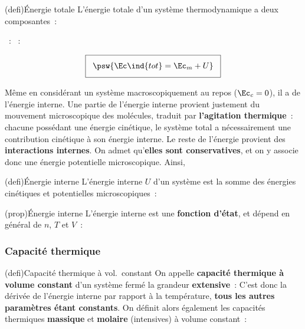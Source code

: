 \documentclass[../../main/main.tex]{subfiles}
\begin{document}
\begin{tcb*}[sidebyside, righthand ratio=.3](defi){Énergie totale}
	L'énergie totale d'un système thermodynamique a deux composantes~:
	\begin{itemize}
		~: 
		~: 
	\end{itemize}
	\vspace{-15pt}
	\tcblower
	\[
		\setlength{\fboxsep}{3mm}
		\boxed{\psw{\Ec\ind{tot} = \Ec_m + U}}
	\]
\end{tcb*}

Même en considérant un système macroscopiquement au repos ($\Ec_c = 0$), il a de
l'énergie interne. Une partie de l'énergie interne provient justement du
mouvement microscopique des molécules, traduit par \textbf{l'agitation
	thermique}~: chacune possédant une énergie cinétique, le système total a
nécessairement une contribution cinétique à son énergie interne.
\bigbreak
Le reste de l'énergie provient des \textbf{interactions internes}. On admet
qu'\textbf{elles sont conservatives}, et on y associe donc une énergie
potentielle microscopique. Ainsi,
\begin{tcb*}(defi){Énergie interne}
	L'énergie interne $U$ d'un système est la somme des énergies cinétiques et
	potentielles microscopiques~:
	\psw{%
	\[
		\boxed{U = e_c + e_p}
		\qav
		e_c = \sum_i e_{c,i} = \sum_i \frac{1}{2}m_i v_i{}^2
	\]
	}%
\end{tcb*}

\begin{tcb*}(prop){Énergie interne}
	L'énergie interne est une \textbf{fonction d'état}, et dépend en général de
	$n$, $T$ et $V$~:
	\psw{%
		\[
			\boxed{U = U (n,T,V)}
		\]
	}%
	\vspace{-15pt}
\end{tcb*}

\subsubsection{Capacité thermique}
\begin{tcb*}[label=defi:cv](defi){Capacité thermique à vol.\ constant}
	On appelle \textbf{capacité thermique à volume constant} d'un système fermé la
	grandeur \textbf{extensive}~:
	\psw{%
		\[
			C_V = \pdv{U}{T}
		\]
	}%
	C'est donc la dérivée de l'énergie interne par rapport à la température,
	\textbf{tous les autres paramètres étant constants}.
	\bigbreak
	On définit alors également les capacités thermiques \textbf{massique} et
	\textbf{molaire} (intensives) à volume constant~:
	\psw{%
		\[
			c_V = \frac{C_V}{m}
			\qqet
			C_{V,m} = \frac{C_V}{n}
		\]
	}%
\end{tcb*}
\end{document}
